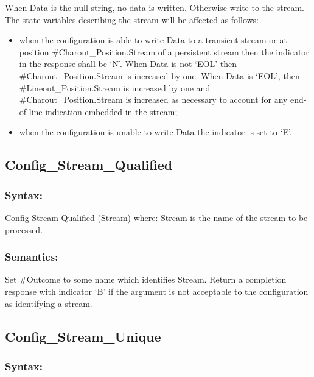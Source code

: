 When Data is the null string, no data is written. Otherwise write to the
stream. The state variables describing the stream will be affected as
follows:

\begin{itemize}
\item
  when the configuration is able to write Data to a transient stream or
  at position \#Charout\_Position.Stream of a persistent stream then the
  indicator in the response shall be `N'. When Data is not `EOL' then
  \#Charout\_Position.Stream is increased by one. When Data is `EOL',
  then \#Lineout\_Position.Stream is increased by one and
  \#Charout\_Position.Stream is increased as necessary to account for
  any end-of-line indication embedded in the stream;
\item
  when the configuration is unable to write Data the indicator is set to
  `E'.
\end{itemize}

\subsection{Config\_Stream\_Qualified}\label{config_stream_qualified}

\subsubsection{Syntax:}\label{syntax-28}

Config Stream Qualified (Stream) where: Stream is the name of the stream
to be processed.

\subsubsection{Semantics:}\label{semantics-29}

Set \#Outcome to some name which identifies Stream. Return a completion
response with indicator `B' if the argument is not acceptable to the
configuration as identifying a stream.

\subsection{Config\_Stream\_Unique}\label{config_stream_unique}

\subsubsection{Syntax:}\label{syntax-29}

